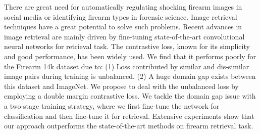 \begin{enumerate}
There are great need for automatically regulating shocking firearm images in social media or identifying firearm types in forensic science. Image retrieval techniques have a great potential to solve such problems. Recent advances in image retrieval are mainly driven by fine-tuning state-of-the-art convolutional neural networks for retrieval task. The contrastive loss, known for its simplicity and good performance, has been widely used. We find that it performs poorly for the Firearm 14k dataset due to: (1) Loss contributed by similar and dis-similar image pairs during training is unbalanced. (2) A huge domain gap exists between this dataset and ImageNet. We propose to deal with the unbalanced loss by employing a double margin contrastive loss. We tackle the domain gap issue with a two-stage training strategy, where we first fine-tune the network for classification and then fine-tune it for retrieval. Extensive experiments show that our approach outperforms the state-of-the-art methods on firearm retrieval task.

\end{enumerate}




